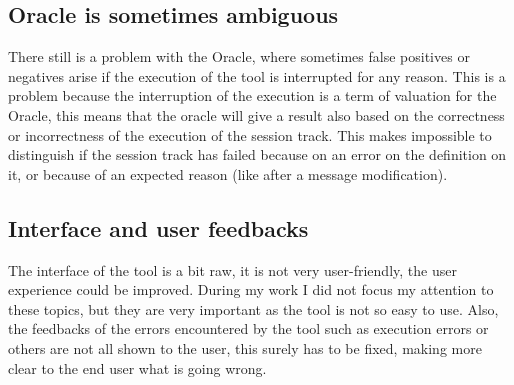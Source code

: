 \subsection{Oracle is sometimes ambiguous}
There still is a problem with the Oracle, where sometimes false positives or negatives arise if the execution of the tool is interrupted for any reason. This is a problem because the interruption of the execution is a term of valuation for the Oracle, this means that the oracle will give a result also based on the correctness or incorrectness of the execution of the \gls{session track}. This makes impossible to distinguish if the \gls{session track} has failed because on an error on the definition on it, or because of an expected reason (like after a message modification).

\subsection{Interface and user feedbacks}
The interface of the tool is a bit raw, it is not very user-friendly, the user experience could be improved. During my work I did not focus my attention to these topics, but they are very important as the tool is not so easy to use. Also, the feedbacks of the errors encountered by the tool such as execution errors or others are not all shown to the user, this surely has to be fixed, making more clear to the end user what is going wrong.





